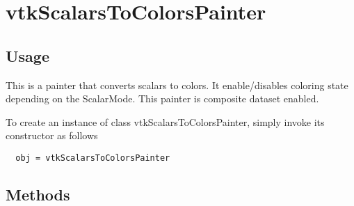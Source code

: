\section{vtkScalarsToColorsPainter}

\subsection{Usage}

 This is a painter that converts scalars to 
 colors. It enable/disables coloring state depending on the ScalarMode.
 This painter is composite dataset enabled.

To create an instance of class vtkScalarsToColorsPainter, simply
invoke its constructor as follows
\begin{verbatim}
  obj = vtkScalarsToColorsPainter
\end{verbatim}
\subsection{Methods}

